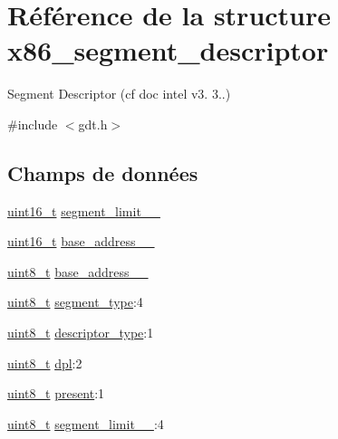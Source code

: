 \hypertarget{structx86__segment__descriptor}{\section{Référence de la structure x86\-\_\-segment\-\_\-descriptor}
\label{structx86__segment__descriptor}
}


Segment Descriptor (cf doc intel v3. 3..)  




{\ttfamily \#include $<$gdt.\-h$>$}

\subsection*{Champs de données}
\begin{DoxyCompactItemize}
\item 
\hyperlink{types_8h_adf4d876453337156dde61095e1f20223}{uint16\-\_\-t} \hyperlink{structx86__segment__descriptor_af9516f6d07c24ddedde31235b05b62c2}{segment\-\_\-limit\-\_\-\_}
\item 
\hyperlink{types_8h_adf4d876453337156dde61095e1f20223}{uint16\-\_\-t} \hyperlink{structx86__segment__descriptor_a6cd0f49e21060fadba677c3b41685ebf}{base\-\_\-address\-\_\-\_}
\item 
\hyperlink{types_8h_aba7bc1797add20fe3efdf37ced1182c5}{uint8\-\_\-t} \hyperlink{structx86__segment__descriptor_a95889fcbabf116ba15a6cea3364b903d}{base\-\_\-address\-\_\-\_}
\item 
\hyperlink{types_8h_aba7bc1797add20fe3efdf37ced1182c5}{uint8\-\_\-t} \hyperlink{structx86__segment__descriptor_ab3ef0c9fce1e74ee6549bbce5ea6f25f}{segment\-\_\-type}\-:4
\item 
\hyperlink{types_8h_aba7bc1797add20fe3efdf37ced1182c5}{uint8\-\_\-t} \hyperlink{structx86__segment__descriptor_adda0434239b7e6c6a68b8e7556e4bb2f}{descriptor\-\_\-type}\-:1
\item 
\hyperlink{types_8h_aba7bc1797add20fe3efdf37ced1182c5}{uint8\-\_\-t} \hyperlink{structx86__segment__descriptor_ab45e49c27bbe57a568d914bd13e45ef7}{dpl}\-:2
\item 
\hyperlink{types_8h_aba7bc1797add20fe3efdf37ced1182c5}{uint8\-\_\-t} \hyperlink{structx86__segment__descriptor_ad4196191d05e69b42272a411a69d1eae}{present}\-:1
\item 
\hyperlink{types_8h_aba7bc1797add20fe3efdf37ced1182c5}{uint8\-\_\-t} \hyperlink{structx86__segment__descriptor_a6ab37b8f7730fe67af946725a3dd064a}{segment\-\_\-limit\-\_\-\_}\-:4

\end{DoxyCompactItemize}

